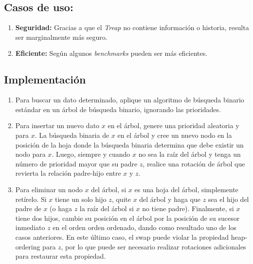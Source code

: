 \documentclass[]{article}
\begin{document}
	\subsection{Casos de uso:}
		\begin{enumerate}
			\item \textbf{Seguridad:} Gracias a que el \textit{Treap} no contiene información o historia, resulta ser marginalmente más seguro.
			\item \textbf{Eficiente:} Según algunos \textit{benchmarks}\cite{fengPinporelmundoSkipLists2011} pueden ser más eficientes.
		\end{enumerate}
	\subsection{Implementación}
		\begin{enumerate}
			\item Para buscar un dato determinado, aplique un algoritmo de búsqueda binario estándar en un árbol de búsqueda binario, ignorando las prioridades.
			
			\item Para insertar un nuevo dato $x$ en el árbol, genere una prioridad aleatoria y para $x$. La búsqueda binaria de $x$ en el árbol y cree un nuevo nodo en la posición de la hoja donde la búsqueda binaria determina que debe existir un nodo para $x$. Luego, siempre y cuando $x$ no sea la raíz del árbol y tenga un número de prioridad mayor que su padre $z$, realice una rotación de árbol que revierta la relación padre-hijo entre $x$ y $z$.
			
			\item Para eliminar un nodo $x$ del árbol, si $x$ es una hoja del árbol, simplemente retírelo. Si $x$ tiene un solo hijo $z$, quite $x$ del árbol y haga que $z$ sea el hijo del padre de $x$ (o haga $z$ la raíz del árbol si $x$ no tiene padre). Finalmente, si $x$ tiene dos hijos, cambie su posición en el árbol por la posición de su sucesor inmediato $z$ en el orden orden ordenado, dando como resultado uno de los casos anteriores. En este último caso, el swap puede violar la propiedad heap-ordering para $z$, por lo que puede ser necesario realizar rotaciones adicionales para restaurar esta propiedad.
		\end{enumerate}
\end{document}
